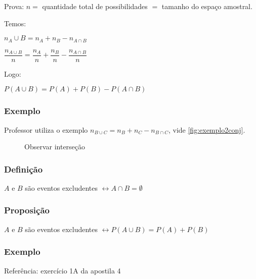 \documentclass[a4paper]{article}
\begin{document}
	Prova: $n =$ quantidade total de possibilidades $=$ tamanho do espaço amostral.
	
	Temos:
	
	$n_A\cup B = n_A + n_B - n_{A \cap B}$
	
	$\dfrac{n_{A\cup B}}{n} = \dfrac{n_{A}}{n} + \dfrac{n_B}{n} - \dfrac{n_{A \cap B}}{n}$

	Logo:
	
	$P(A \cup B) = P(A) + P(B) - P(A \cap B)$
	
	\subsubsection{Exemplo}
	
	Professor utiliza o exemplo $n_{B \cup C} = n_{B} + n_{C} - n_{B \cap C}$, vide \autoref{fig:exemplo2conj}.
	
	\begin{figure}[h]
	\centering
		\caption{Observar interseção}
		\label{fig:exemplo2conj}
	\end{figure}
	
	\subsubsection{Definição}
	
	$A$ e $B$ são eventos excludentes \hspace{5mm} $\leftrightarrow A \cap B = \emptyset$
	
	\subsubsection{Proposição}
	
	$A$ e $B$ são eventos excludentes \hspace{5mm} $\leftrightarrow P(A \cup B) = P(A) + P(B)$
	
	\subsubsection{Exemplo}
	
	Referência: exercício 1A da apostila 4
	
\end{document}
